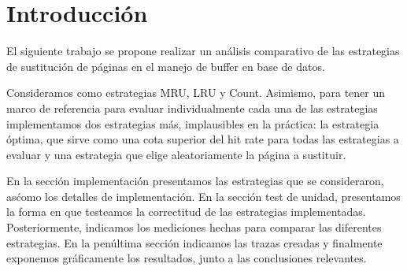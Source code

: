 \section{Introducci\'on}

El siguiente trabajo se propone realizar un an\'alisis comparativo de las estrategias de sustituci\'on de p\'aginas en el manejo de buffer en base de datos. 

Consideramos como estrategias MRU, LRU y Count. Asimismo, para tener un marco de referencia para evaluar individualmente cada una de las estrategias implementamos dos estrategias m\'as, implausibles en la pr\'actica: la estrategia \'optima, que sirve como una cota superior del hit    rate para todas las estrategias a evaluar y una estrategia que elige aleatoriamente la p\'agina a sustituir.

En la secci\'on implementaci\'on presentamos las estrategias que se consideraron, as\' como los detalles de implementaci\'on. En la secci\'on test de unidad, presentamos la forma en que testeamos la correctitud de las estrategias implementadas. Posteriormente, indicamos los mediciones hechas para comparar las diferentes estrategias. En la pen\'ultima secci\'on indicamos las trazas creadas y finalmente exponemos gr\'aficamente los resultados, junto a las conclusiones relevantes.
